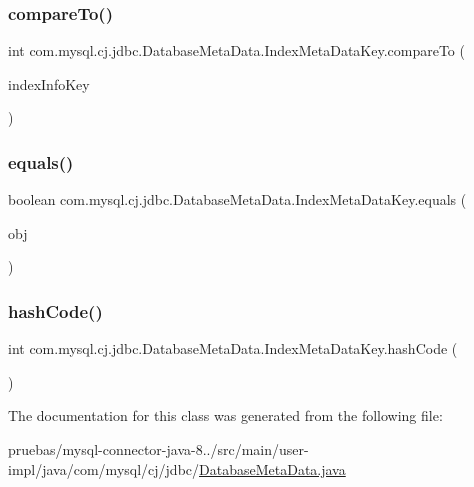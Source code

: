 \subsubsection{\texorpdfstring{compare\+To()}{compareTo()}}
{\footnotesize\ttfamily int com.\+mysql.\+cj.\+jdbc.\+Database\+Meta\+Data.\+Index\+Meta\+Data\+Key.\+compare\+To (\begin{DoxyParamCaption}\item[{\mbox{\hyperlink{classcom_1_1mysql_1_1cj_1_1jdbc_1_1_database_meta_data_1_1_index_meta_data_key}{Index\+Meta\+Data\+Key}}}]{index\+Info\+Key }\end{DoxyParamCaption})}

\mbox{\label{classcom_1_1mysql_1_1cj_1_1jdbc_1_1_database_meta_data_1_1_index_meta_data_key_a6f39b445ccd5ebd23703172179164a50}} 
\subsubsection{\texorpdfstring{equals()}{equals()}}
{\footnotesize\ttfamily boolean com.\+mysql.\+cj.\+jdbc.\+Database\+Meta\+Data.\+Index\+Meta\+Data\+Key.\+equals (\begin{DoxyParamCaption}\item[{Object}]{obj }\end{DoxyParamCaption})}

\mbox{\label{classcom_1_1mysql_1_1cj_1_1jdbc_1_1_database_meta_data_1_1_index_meta_data_key_ae3059fb058d0cd9e17592a4a93d88c20}} 
\subsubsection{\texorpdfstring{hash\+Code()}{hashCode()}}
{\footnotesize\ttfamily int com.\+mysql.\+cj.\+jdbc.\+Database\+Meta\+Data.\+Index\+Meta\+Data\+Key.\+hash\+Code (\begin{DoxyParamCaption}{ }\end{DoxyParamCaption})}



The documentation for this class was generated from the following file\+:\begin{DoxyCompactItemize}
\item 
pruebas/mysql-\/connector-\/java-\/8../src/main/user-\/impl/java/com/mysql/cj/jdbc/\mbox{\hyperlink{_database_meta_data_8java}{Database\+Meta\+Data.\+java}}\end{DoxyCompactItemize}

